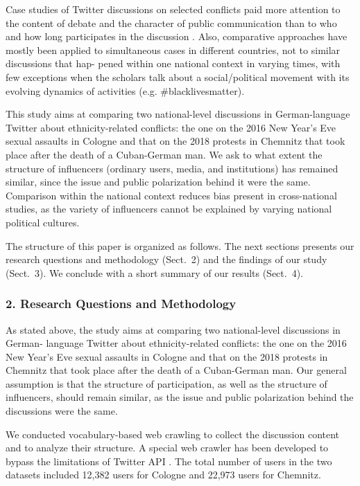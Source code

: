 Case studies of Twitter discussions on selected conflicts paid more attention to the content of debate and the character of public communication than to who and how long participates in the discussion \cite{GroshekTandoc}. Also, comparative approaches have mostly been applied to simultaneous cases in different countries, not to similar discussions that hap- pened within one national context in varying times, with few exceptions when the scholars talk about a social/political movement with its evolving dynamics of activities (e.g. \#blacklivesmatter).

This study aims at comparing two national-level discussions in German-language Twitter about ethnicity-related conflicts: the one on the 2016 New Year’s Eve sexual assaults in Cologne and that on the 2018 protests in Chemnitz that took place after the death of a Cuban-German man. We ask to what extent the structure of influencers (ordinary users, media, and institutions) has remained similar, since the issue and public polarization behind it were the same. Comparison within the national context reduces bias present in cross-national studies, as the variety of influencers cannot be explained by varying national political cultures.

The structure of this paper is organized as follows. The next sections presents our research questions and methodology (Sect.~2) and the findings of our study (Sect.~3). We conclude with a short summary of our results (Sect.~4).

\subsubsection{2. Research Questions and Methodology}

As stated above, the study aims at comparing two national-level discussions in German- language Twitter about ethnicity-related conflicts: the one on the 2016 New Year’s Eve sexual assaults in Cologne and that on the 2018 protests in Chemnitz that took place after the death of a Cuban-German man. Our general assumption is that the structure of participation, as well as the structure of influencers, should remain similar, as the issue and public polarization behind the discussions were the same.

We conducted vocabulary-based web crawling to collect the discussion content and to analyze their structure. A special web crawler has been developed to bypass the limitations of Twitter API \cite{BlekanovSergeevMartynenko}. The total number of users in the two datasets included 12,382 users for Cologne and 22,973 users for Chemnitz.

